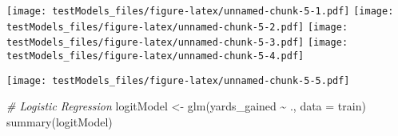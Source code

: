 \documentclass[
]{article}
\newenvironment{Shaded}{\begin{snugshade}}{\end{snugshade}}
\newcommand{\AttributeTok}[1]{\textcolor[rgb]{0.77,0.63,0.00}{#1}}
\newcommand{\CommentTok}[1]{\textcolor[rgb]{0.56,0.35,0.01}{\textit{#1}}}
\newcommand{\DecValTok}[1]{\textcolor[rgb]{0.00,0.00,0.81}{#1}}
\newcommand{\FunctionTok}[1]{\textcolor[rgb]{0.00,0.00,0.00}{#1}}
\newcommand{\NormalTok}[1]{#1}
\newcommand{\OtherTok}[1]{\textcolor[rgb]{0.56,0.35,0.01}{#1}}
\newcommand{\SpecialCharTok}[1]{\textcolor[rgb]{0.00,0.00,0.00}{#1}}
\newcommand{\StringTok}[1]{\textcolor[rgb]{0.31,0.60,0.02}{#1}}
\begin{document}
\texttt{[image: testModels\_files/figure-latex/unnamed-chunk-5-1.pdf]}
\texttt{[image: testModels\_files/figure-latex/unnamed-chunk-5-2.pdf]}
\texttt{[image: testModels\_files/figure-latex/unnamed-chunk-5-3.pdf]}
\texttt{[image: testModels\_files/figure-latex/unnamed-chunk-5-4.pdf]}

\begin{Shaded}
\end{Shaded}

\texttt{[image: testModels\_files/figure-latex/unnamed-chunk-5-5.pdf]}

\begin{Shaded}
\end{Shaded}

\begin{Shaded}
\begin{Highlighting}[]
\CommentTok{\# Logistic Regression}
\NormalTok{logitModel }\OtherTok{\textless{}{-}} \FunctionTok{glm}\NormalTok{(yards\_gained }\SpecialCharTok{\textasciitilde{}}\NormalTok{ ., }\AttributeTok{data =}\NormalTok{ train)}
\FunctionTok{summary}\NormalTok{(logitModel)}
\end{Highlighting}
\end{Shaded}
\end{document}
